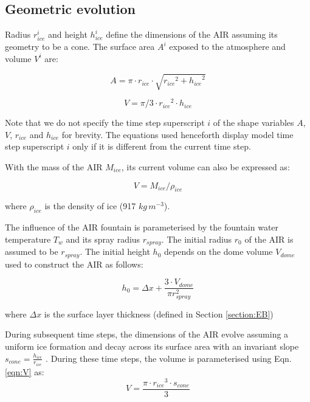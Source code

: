 \documentclass[utf8]{frontiersSCNS} %
\begin{document}
\subsection{Geometric evolution}

Radius $r_{ice}^i$ and height $h_{ice}^i$ define the dimensions of the AIR assuming its geometry to be a cone. The surface area $A^i$ exposed to the atmosphere and volume $V^i$ are:

\begin{equation} A = \pi \cdot r_{ice} \cdot \sqrt{{r_{ice}}^2 + {h_{ice}}^ 2} \label{eqn:A} \end{equation}

\begin{equation} V = \pi/3 \cdot {r_{ice}}^2 \cdot h_{ice} \label{eqn:V} \end{equation}

Note that we do not specify the time step superscript $i$ of the shape variables $A$, $V$, $r_{ice}$ and $h_{ice}$ for
brevity.  The equations used henceforth display model time step superscript $i$ only if it is different from the
current time step.

With the mass of the AIR $M_{ice}$, its current volume can also be expressed as: 

\begin{equation} V = M_{ice} /\rho_{ice} \label{eqn:V1} \end{equation} 

where $\rho_{ice}$ is the density of ice (917 $kg\, m^{-3}$). 


The influence of the AIR fountain is parameterised by the fountain water temperature $T_{w}$ and its spray radius $r_{spray}$.
The initial radius $r_0$ of the AIR is assumed to be $r_{spray}$. The initial height $h_0$ depends on the dome volume
$V_{dome}$ used to construct the AIR as follows:

\begin{equation} 
    h_{0} =  \Delta x + \frac{3 \cdot V_{dome}}{\pi r_{spray}^2 } 
\label{eqn:h0}
  \end{equation}

where $\Delta x$ is the surface layer thickness (defined in Section \ref{section:EB})

During subsequent time steps, the dimensions of the AIR evolve assuming a uniform ice formation and decay across
its surface area with an invariant slope $s_{cone} = \frac{h_{ice}}{r_{ice}}$ .  During
these time steps, the volume is parameterised using Eqn. \ref{eqn:V} as:\begin{equation} V = \frac{\pi \cdot {r_{ice}}^3
    \cdot s_{cone}}{3} \label{eqn:V2} \end{equation} 
\end{document}
